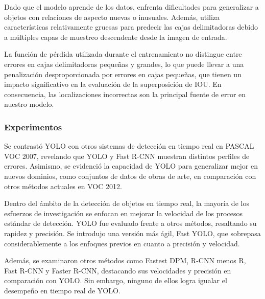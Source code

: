 Dado que el modelo aprende de los datos, enfrenta dificultades para generalizar a objetos con relaciones de aspecto nuevas o inusuales. Además, utiliza características relativamente gruesas para predecir las cajas delimitadoras debido a múltiples capas de muestreo descendente desde la imagen de entrada.

La función de pérdida utilizada durante el entrenamiento no distingue entre errores en cajas delimitadoras pequeñas y grandes, lo que puede llevar a una penalización desproporcionada por errores en cajas pequeñas, que tienen un impacto significativo en la evaluación de la superposición de IOU. En consecuencia, las localizaciones incorrectas son la principal fuente de error en nuestro modelo.

\subsubsection{Experimentos}
Se contrastó YOLO con otros sistemas de detección en tiempo real en PASCAL VOC 2007, revelando que YOLO y Fast R-CNN muestran distintos perfiles de errores. Asimismo, se evidenció la capacidad de YOLO para generalizar mejor en nuevos dominios, como conjuntos de datos de obras de arte, en comparación con otros métodos actuales en VOC 2012.

Dentro del ámbito de la detección de objetos en tiempo real, la mayoría de los esfuerzos de investigación se enfocan en mejorar la velocidad de los procesos estándar de detección. YOLO fue evaluado frente a otros métodos, resaltando su rapidez y precisión. Se introdujo una versión más ágil, Fast YOLO, que sobrepasa considerablemente a los enfoques previos en cuanto a precisión y velocidad.

Además, se examinaron otros métodos como Fastest DPM, R-CNN menos R, Fast R-CNN y Faster R-CNN, destacando sus velocidades y precisión en comparación con YOLO. Sin embargo, ninguno de ellos logra igualar el desempeño en tiempo real de YOLO.

